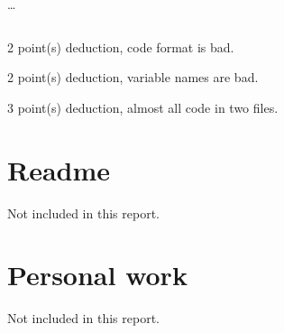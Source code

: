 \documentclass{article}
\begin{document}
\inputminted[firstline=625,lastline=634]{elm}{P1team17set.elm}

\dots

\inputminted[firstline=654,lastline=663]{elm}{P1team17set.elm}

2 point(s) {\color{red}deduction}, code format is bad.\medskip

2 point(s) {\color{red}deduction}, variable names are bad.\medskip

3 point(s) {\color{red}deduction}, almost all code in two files.\medskip



\newpage

\section{Readme}

Not included in this report.

\section{Personal work}

Not included in this report.


\newpage
\end{document}
